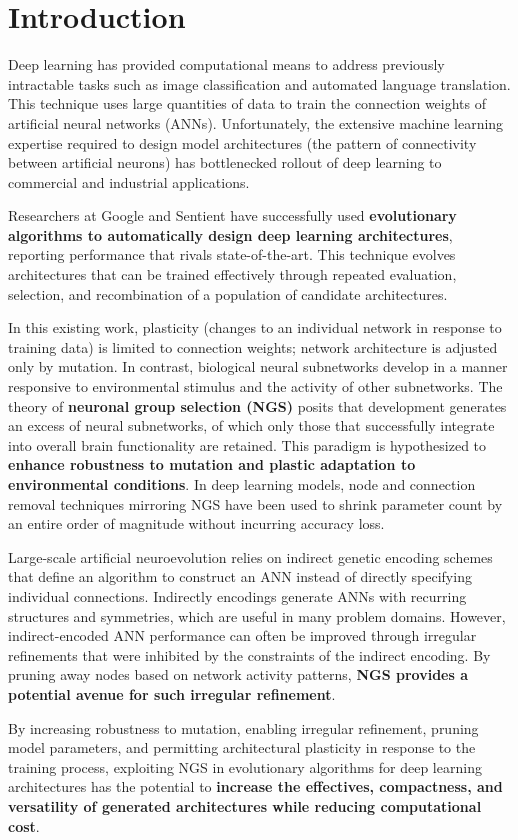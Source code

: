 \section{Introduction}

Deep learning has provided computational means to address previously intractable tasks such as image classification and automated language translation.
This technique uses large quantities of data to train the connection weights of artificial neural networks (ANNs).
Unfortunately, the extensive machine learning expertise required to design model architectures (the pattern of connectivity between artificial neurons) has bottlenecked rollout of deep learning to commercial and industrial applications.

Researchers at Google\autocite{real2017large} and Sentient\autocite{miikkulainen2017evolving} have successfully used \textbf{evolutionary algorithms to automatically design deep learning architectures}, reporting performance that rivals state-of-the-art.
This technique evolves architectures that can be trained effectively through repeated evaluation, selection, and recombination of a population of candidate architectures.

In this existing work, plasticity (changes to an individual network in response to training data) is limited to connection weights;
network architecture is adjusted only by mutation.
In contrast, biological neural subnetworks develop in a manner responsive to environmental stimulus and the activity of other subnetworks.
The theory of \textbf{neuronal group selection (NGS)} posits that development generates an excess of neural subnetworks, of which only those that successfully integrate into overall brain functionality are retained.\autocite{sanes2011development}
This paradigm is hypothesized to \textbf{enhance robustness to mutation and plastic adaptation to environmental conditions}.\autocite{downing2015intelligence}
In deep learning models, node and connection removal techniques mirroring NGS have been used to shrink parameter count by an entire order of magnitude without incurring accuracy loss.\autocite{song2015learning}

Large-scale artificial neuroevolution relies on indirect genetic encoding schemes that define an algorithm to construct an ANN instead of directly specifying individual connections.
Indirectly encodings generate ANNs with recurring structures and symmetries, which are useful in many problem domains.
However, indirect-encoded ANN performance can often be improved through irregular refinements that were inhibited by the constraints of the indirect encoding.\autocite{clune2011performance}
By pruning away nodes based on network activity patterns, \textbf{NGS provides a potential avenue for such irregular refinement}.

By increasing robustness to mutation, enabling irregular refinement, pruning model parameters, and permitting architectural plasticity in response to the training process, exploiting NGS in evolutionary algorithms for deep learning architectures has the potential to \textbf{increase the effectives, compactness, and versatility of generated architectures while reducing computational cost}.
